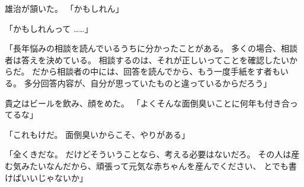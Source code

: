\documentclass[chapter3.tex]{subfiles}
\begin{document}
\begin{CJK}{UTF8}{ipxm}
    雄治が頷いた。
    「かもしれん」

    「かもしれんって \ldots\ldots」

    「長年悩みの相談を読んでいるうちに分かったことがある。
    多くの場合、相談者は答えを決めている。
    相談するのは、それが正しいってことを確認したいからだ。
    だから相談者の中には、回答を読んでから、もう一度手紙をす者もいる。
    多分回答内容が、自分が思っていたものと違っているからだろう」

    貴之はビールを飲み、顔をめた。
    「よくそんな面倒臭いことに何年も付き合ってるな」

    「これもけだ。
    面倒臭いからこそ、やりがある」

    「全くきだな。
    だけどそういうことなら、考える必要はないだろ。
    その人は産む気みたいなんだから、頑張って元気な赤ちゃんを産んでください、
    とでも書けばいいじゃないか」


\end{CJK}
\end{document}
